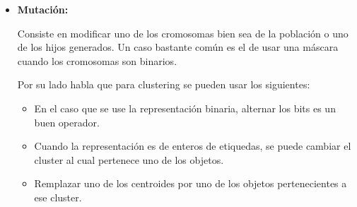 \begin{itemize}
\begin{itemize}
\item {\bf De un punto:} Si se tienen dos padres de longitud $X$, se va a tomar
un punto entre $[1,X-1]$ y se generan dos hijos de la siguiente manera: el primero,
de 0 al punto con los genes del primer padre y del punto a $X$, y el segundo es 
lo contrario.

{\em Ejemplo:} Si se tienen los padres [1 3 2 4 6]  y [5 1 3 6 2] y el punto 
de crude es el 2, entonces se generan los siguientes hijos:

[1 3 3 6 2] y [5 1 2 4 6]

\item {\bf De dos punto:} Ac\'a se eligen dos puntos distintos que cumplan con la 
misma condici\'on como en el de un punto. Para explicar es mucho mas sencillo
mediante un ejemplo:

Si se tienen los padres [1 3 2 4 6]  y [5 1 3 6 2] y los puntos 
de crude son el 2 y 4, entonces se generan los siguientes hijos:

[1 3 3 6 6] y [5 1 2 6 2]

De esta misma forma se puede extender para m\'as puntos.

\end{itemize}

\item {\bf Mutaci\'on:}

Consiste en modificar uno de los cromosomas bien sea de la poblaci\'on
o uno de los hijos generados. Un caso bastante com\'un es el de usar una m\'ascara
cuando los cromosomas son binarios\cite{GePo2010}.

Por su lado \cite{GePo2010} habla que para clustering se pueden usar los siguientes:

\begin{itemize}

\item En el caso que se use la representaci\'on binaria, alternar los bits es un
buen operador.

\item Cuando la representaci\'on es de enteros de etiquedas, se puede cambiar
el cluster al cual pertenece uno de los objetos.

\item Remplazar uno de los centroides por uno de los objetos pertenecientes a ese
cluster.

\end{itemize}

\end{itemize}

